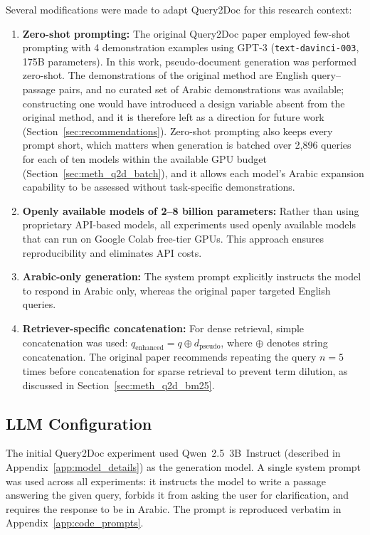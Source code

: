 Several modifications were made to adapt Query2Doc for this research context:

\begin{enumerate}
    \item \textbf{Zero-shot prompting:} The original Query2Doc paper employed few-shot prompting with 4 demonstration examples using GPT-3 (\texttt{text-davinci-003}, 175B parameters). In this work, pseudo-document generation was performed zero-shot. The demonstrations of the original method are English query--passage pairs, and no curated set of Arabic demonstrations was available; constructing one would have introduced a design variable absent from the original method, and it is therefore left as a direction for future work (Section~\ref{sec:recommendations}). Zero-shot prompting also keeps every prompt short, which matters when generation is batched over 2,896 queries for each of ten models within the available GPU budget (Section~\ref{sec:meth_q2d_batch}), and it allows each model's Arabic expansion capability to be assessed without task-specific demonstrations.

    \item \textbf{Openly available models of 2--8 billion parameters:} Rather than using proprietary API-based models, all experiments used openly available models that can run on Google Colab free-tier GPUs. This approach ensures reproducibility and eliminates API costs.

    \item \textbf{Arabic-only generation:} The system prompt explicitly instructs the model to respond in Arabic only, whereas the original paper targeted English queries.

    \item \textbf{Retriever-specific concatenation:} For dense retrieval, simple concatenation was used: $q_{\text{enhanced}} = q \oplus d_{\text{pseudo}}$, where $\oplus$ denotes string concatenation. The original paper recommends repeating the query $n=5$ times before concatenation for sparse retrieval to prevent term dilution, as discussed in Section~\ref{sec:meth_q2d_bm25}.
\end{enumerate}

\subsection{LLM Configuration}
\label{sec:meth_q2d_llm}

The initial Query2Doc experiment used Qwen~2.5~3B~Instruct (described in Appendix~\ref{app:model_details}) as the generation model. A single system prompt was used across all experiments: it instructs the model to write a passage answering the given query, forbids it from asking the user for clarification, and requires the response to be in Arabic. The prompt is reproduced verbatim in Appendix~\ref{app:code_prompts}.


